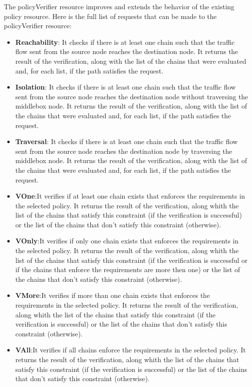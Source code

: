 The policyVerifier resource improves and extends the behavior of the existing policy resource. Here is the full list of requests that can be made to the policyVerifier resource:
\begin{itemize}
 \item \textbf{Reachability}: It checks if there is at least one chain such that the traffic flow sent from the source node reaches the destination node. It returns the result of the verification, along with the list of the chains that were evaluated and, for each list, if the path satisfies the request.
 \item \textbf{Isolation}: It checks if there is at least one chain such that the traffic flow sent from the source node reaches the destination node without traversing the middlebox node. It returns the result of the verification, along with the list of the chains that were evaluated and, for each list, if the path satisfies the request.
 \item \textbf{Traversal}: It checks if there is at least one chain such that the traffic flow sent from the source node reaches the destination node by traversing the middlebox node. It returns the result of the verification, along with the list of the chains that were evaluated and, for each list, if the path satisfies the request.
 \item \textbf{VOne}:It verifies if at least one chain exists that enforces the requirements in the selected policy. It returns the result of the verification, along whith the list of the chains that satisfy this constraint (if the verification is successful) or the list of the chains that don't satisfy this constraint (otherwise).
 \item \textbf{VOnly}:It verifies if only one chain exists that enforces the requirements in the selected policy. It returns the result of the verification, along whith the list of the chains that satisfy this constraint (if the verification is successful or if the chains that enforce the requirements are more then one) or the list of the chains that don't satisfy this constraint (otherwise).
 \item \textbf{VMore}:It verifies if more than one chain exists that enforces the requirements in the selected policy. It returns the result of the verification, along whith the list of the chains that satisfy this constraint (if the verification is successful) or the list of the chains that don't satisfy this constraint (otherwise).
 \item \textbf{VAll}:It verifies if all chains enforce the requirements in the selected policy. It returns the result of the verification, along whith the list of the chains that satisfy this constraint (if the verification is successful) or the list of the chains that don't satisfy this constraint (otherwise).

\end{itemize}
